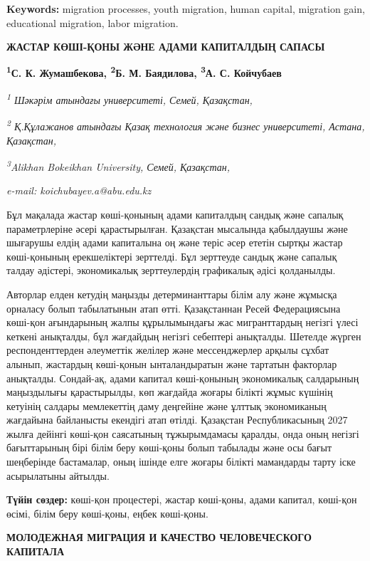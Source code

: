 {{\bfseries Keywords:} migration processes, youth migration, human capital,
migration gain, educational migration, labor migration.

{\bfseries ЖАСТАР КӨШІ-ҚОНЫ ЖӘНЕ АДАМИ КАПИТАЛДЫҢ САПАСЫ}

{\bfseries \textsuperscript{1}С. К. Жумашбекова, \textsuperscript{2}Б. М.
Баядилова, \textsuperscript{3}А. С. Койчубаев\textsuperscript{\envelope }}

\emph{\textsuperscript{1} Шәкәрім атындағы университеті, Семей,
Қазақстан}\emph{,}

\emph{\textsuperscript{2} Қ.Құлажанов атындағы Қазақ технология және
бизнес университеті, Астана, Қазақстан,}

\emph{\textsuperscript{3}Alikhan Bokeikhan University, Семей,
Қазақстан,}

\emph{e-mail: koichubayev.a@abu.edu.kz}

Бұл мақалада жастар көші-қонының адами капиталдың сандық және сапалық
параметрлеріне әсері қарастырылған. Қазақстан мысалында қабылдаушы және
шығарушы елдің адами капиталына оң және теріс әсер ететін сыртқы жастар
көші-қонының ерекшеліктері зерттелді. Бұл зерттеуде сандық және сапалық
талдау әдістері, экономикалық зерттеулердің графикалық әдісі қолданылды.

Авторлар елден кетудің маңызды детерминанттары білім алу және жұмысқа
орналасу болып табылатынын атап өтті. Қазақстаннан Ресей Федерациясына
көші-қон ағындарының жалпы құрылымындағы жас мигранттардың негізгі үлесі
кеткені анықталды, бұл жағдайдың негізгі себептері анықталды. Шетелде
жүрген респонденттерден әлеуметтік желілер және мессенджерлер арқылы
сұхбат алынып, жастардың көші-қонын ынталандыратын және тартатын
факторлар анықталды. Сондай-ақ, адами капитал көші-қонының экономикалық
салдарының маңыздылығы қарастырылды, көп жағдайда жоғары білікті жұмыс
күшінің кетуінің салдары мемлекеттің даму деңгейіне және ұлттық
экономиканың жағдайына байланысты екендігі атап өтілді. Қазақстан
Республикасының 2027 жылға дейінгі көші-қон саясатының тұжырымдамасы
қаралды, онда оның негізгі бағыттарының бірі білім беру көші-қоны болып
табылады және осы бағыт шеңберінде бастамалар, оның ішінде елге жоғары
білікті мамандарды тарту іске асырылатыны айтылды.

{\bfseries Түйін сөздер:} көші-қон процестері, жастар көші-қоны, адами
капитал, көші-қон өсімі, білім беру көші-қоны, еңбек көші-қоны.

{\bfseries МОЛОДЕЖНАЯ МИГРАЦИЯ И КАЧЕСТВО ЧЕЛОВЕЧЕСКОГО КАПИТАЛА}

}
